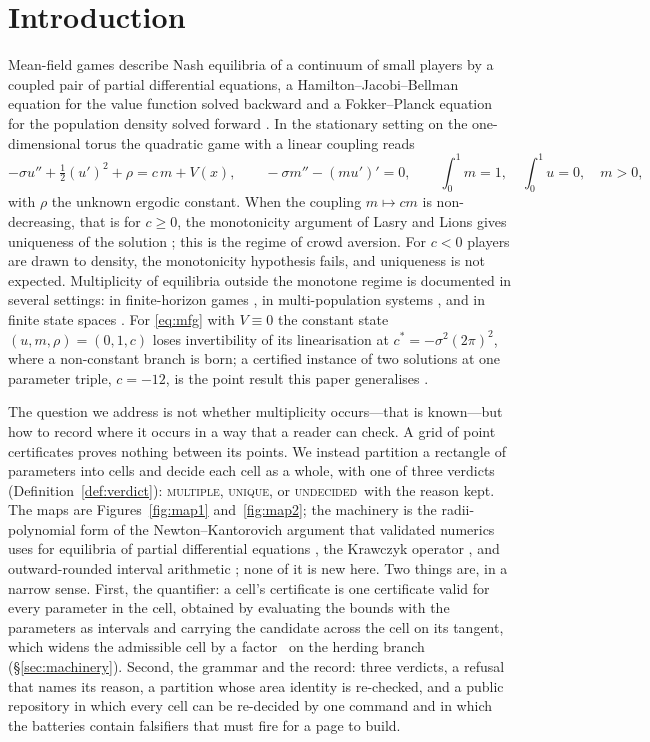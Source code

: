 \documentclass[11pt]{article}
\theoremstyle{definition}
\newcommand{\MULT}{\textup{\textsc{multiple}}}
\newcommand{\UNIQ}{\textup{\textsc{unique}}}
\newcommand{\UNDEC}{\textup{\textsc{undecided}}}
\newcommand{\cstar}{c^{*}}
\begin{document}
\section{Introduction}

Mean-field games describe Nash equilibria of a continuum of small players by a coupled pair of partial differential equations, a Hamilton--Jacobi--Bellman equation for the value function solved backward and a Fokker--Planck equation for the population density solved forward \cite{LL06a,LL07,HMC06}. In the stationary setting on the one-dimensional torus the quadratic game with a linear coupling reads
\begin{equation}\label{eq:mfg}
-\sigma u'' + \tfrac12 (u')^2 + \rho = c\,m + V(x),\qquad -\sigma m'' - (m u')' = 0,\qquad \int_0^1 m = 1,\quad \int_0^1 u = 0,\quad m>0,
\end{equation}
with $\rho$ the unknown ergodic constant. When the coupling $m\mapsto cm$ is non-decreasing, that is for $c\ge0$, the monotonicity argument of Lasry and Lions gives uniqueness of the solution \cite{LL07}; this is the regime of crowd aversion. For $c<0$ players are drawn to density, the monotonicity hypothesis fails, and uniqueness is not expected. Multiplicity of equilibria outside the monotone regime is documented in several settings: in finite-horizon games \cite{BF19}, in multi-population systems \cite{Ci15,CV17}, and in finite state spaces \cite{CDFP19}. For \eqref{eq:mfg} with $V\equiv0$ the constant state $(u,m,\rho)=(0,1,c)$ loses invertibility of its linearisation at $\cstar=-\sigma^2(2\pi)^2$, where a non-constant branch is born; a certified instance of two solutions at one parameter triple, $c=-12$, is the point result this paper generalises \cite{CapPage}.

The question we address is not whether multiplicity occurs---that is known---but how to record where it occurs in a way that a reader can check. A grid of point certificates proves nothing between its points. We instead partition a rectangle of parameters into cells and decide each cell as a whole, with one of three verdicts (Definition~\ref{def:verdict}): \MULT, \UNIQ, or \UNDEC\ with the reason kept. The maps are Figures~\ref{fig:map1} and~\ref{fig:map2}; the machinery is the radii-polynomial form of the Newton--Kantorovich argument that validated numerics uses for equilibria of partial differential equations \cite{DLM07,vdBL15,GLP16}, the Krawczyk operator \cite{Kr69,Mo77,Ru10}, and outward-rounded interval arithmetic \cite{Tu11}; none of it is new here. Two things are, in a narrow sense. First, the quantifier: a cell's certificate is one certificate valid for every parameter in the cell, obtained by evaluating the bounds with the parameters as intervals and carrying the candidate across the cell on its tangent, which widens the admissible cell by a factor \BatOneXtwoRatio\ on the herding branch (\S\ref{sec:machinery}). Second, the grammar and the record: three verdicts, a refusal that names its reason, a partition whose area identity is re-checked, and a public repository in which every cell can be re-decided by one command and in which the batteries contain falsifiers that must fire for a page to build.
\end{document}
